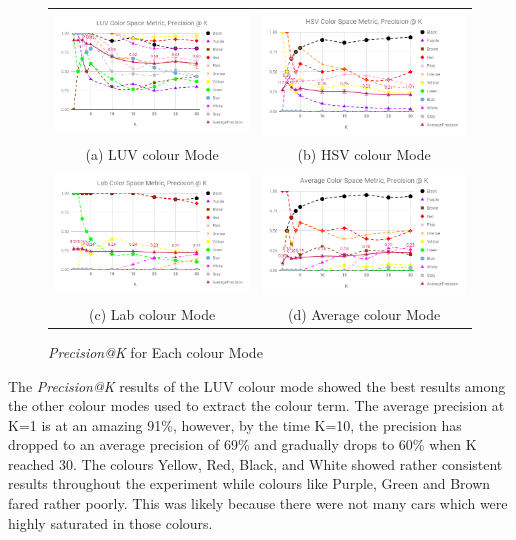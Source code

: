 \begin{figure}[htb!]
  \centering
\begin{tabular}{cc}
 \includegraphics[width=0.5\linewidth]{image/new/luv@k.png} &
 \includegraphics[width=0.5\linewidth]{image/new/hsv@k.png}\\
 (a) LUV colour Mode &
 (b) HSV colour Mode \\
 \includegraphics[width=0.5\linewidth]{image/new/lab@k.png} &
 \includegraphics[width=0.5\linewidth]{image/new/avg@k.png} \\
 (c) Lab colour Mode&
 (d) Average colour Mode \\
\end{tabular}
\caption{\textit{Precision@K} for Each colour Mode} \label{fig:colorspace_score}
\end{figure}

The \textit{Precision@K} results of the LUV colour mode showed the best results among the other colour modes used to extract the colour term. The average precision at K=1 is at an amazing 91\%, however, by the time K=10, the precision has dropped to an average precision of 69\% and gradually drops to 60\% when K reached 30. The colours Yellow, Red, Black, and White showed rather consistent results throughout the experiment while colours like Purple, Green and Brown fared rather poorly. This was likely because there were not many cars which were highly saturated in those colours. 

